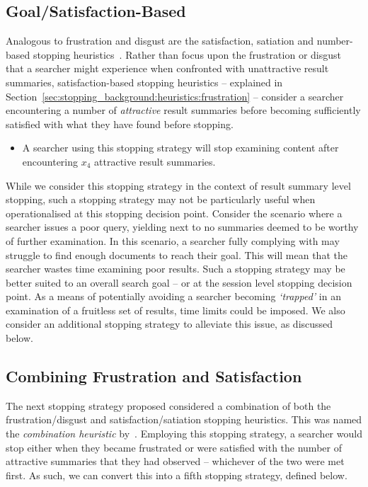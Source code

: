 \subsection{Goal/Satisfaction-Based}
Analogous to frustration and disgust are the satisfaction, satiation and number-based stopping heuristics~\citep{cooper1973retrieval_effectiveness_ii, simon1955satiation, gibb1958number_rule}. Rather than focus upon the frustration or disgust that a searcher might experience when confronted with unattractive result summaries, satisfaction-based stopping heuristics -- explained in Section~\ref{sec:stopping_background:heuristics:frustration} -- consider a searcher encountering a number of \emph{attractive} result summaries before becoming sufficiently satisfied with what they have found before stopping.

\begin{itemize}
    \item{ A searcher using this stopping strategy will stop examining content after encountering $x_4$ attractive result summaries.}
\end{itemize}

While we consider this stopping strategy in the context of result summary level stopping, such a stopping strategy may not be particularly useful when operationalised at this stopping decision point. Consider the scenario where a searcher issues a poor query, yielding next to no summaries deemed to be worthy of further examination. In this scenario, a searcher fully complying with  may struggle to find enough documents to reach their goal. This will mean that the searcher wastes time examining poor results. Such a stopping strategy may be better suited to an overall search goal -- or at the session level stopping decision point. As a means of potentially avoiding a searcher becoming \emph{`trapped'} in an examination of a fruitless set of results, time limits could be imposed. We also consider an additional stopping strategy to alleviate this issue, as discussed below.

\subsection{Combining Frustration and Satisfaction}
The next stopping strategy proposed considered a combination of both the frustration/disgust and satisfaction/satiation stopping heuristics. This was named the \emph{combination heuristic} by~\cite{kraft1979stopping_rules}. Employing this stopping strategy, a searcher would stop either when they became frustrated or were satisfied with the number of attractive summaries that they had observed -- whichever of the two were met first. As such, we can convert this into a fifth stopping strategy, defined below.

